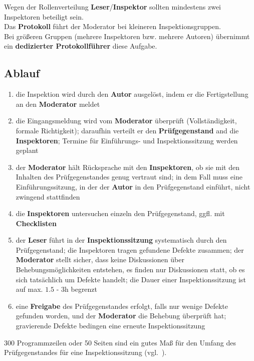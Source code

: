 \noindent
Wegen der Rollenverteilung \textbf{Leser}/\textbf{Inspektor} sollten mindestens zwei Inspektoren beteiligt sein.\\

\noindent
Das \textbf{Protokoll} führt der Moderator bei kleineren Inspektionsgruppen.\\
Bei größeren Gruppen (mehrere Inspektoren bzw. mehrere Autoren) übernimmt ein \textbf{dedizierter Protokollführer} diese Aufgabe.

\subsection{Ablauf}

\begin{enumerate}
    \item die Inspektion wird durch den \textbf{Autor} ausgelöst, indem er die Fertigstellung an den \textbf{Moderator} meldet
    \item die Eingangsmeldung wird vom \textbf{Moderator} überprüft (Vollständigkeit, formale Richtigkeit); daraufhin verteilt er den \textbf{Prüfgegenstand} and die \textbf{Inspektoren}; Termine für Einführungs- und Inspektionssitzung werden geplant
    \item der \textbf{Moderator} hält Rücksprache mit den \textbf{Inspektoren}, ob sie mit den Inhalten des Prüfgegenstandes genug vertraut sind; in dem Fall muss eine Einführungssitzung, in der der \textbf{Autor} in den Prüfgegenstand einführt, nicht zwingend stattfinden
    \item die \textbf{Inspektoren} untersuchen einzeln den Prüfgegenstand, ggfl. mit \textbf{Checklisten}
    \item der \textbf{Leser} führt in der \textbf{Inspektionssitzung} systematisch durch den Prüfgegenstand; die Inspektoren tragen gefundene Defekte zusammen; der \textbf{Moderator} stellt sicher, dass keine Diskussionen über Behebungsmöglichkeiten entstehen, es finden nur Diskussionen statt, ob  es sich tatsächlich um Defekte handelt; die Dauer einer Inspektionssitzung ist auf max. $1.5$ - $3$h begrenzt
    \item eine \textbf{Freigabe} des Prüfgegenstandes erfolgt, falls nur wenige Defekte gefunden worden, und der \textbf{Moderator} die Behebung überprüft hat; gravierende Defekte bedingen eine erneute Inspektionssitzung
\end{enumerate}

\begin{tcolorbox}[colback=white]
300 Programmzeilen oder 50 Seiten sind ein gutes Maß für den Umfang des Prüfgegenstandes für eine Inspektionssitzung (vgl.~\cite[20]{Wed09c}).\\
\end{tcolorbox}


